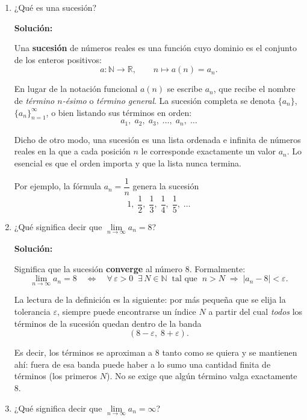 \documentclass[12pt]{article}
\newcommand{\solucion}{%
    \vspace{0.8em}%
    \textbf{Solución:}%
}
\begin{document}
\begin{enumerate}[label=\alph*.-]

    \item ¿Qué es una sucesión?

    \solucion

    Una \textbf{sucesión} de números reales es una función cuyo dominio es el
    conjunto de los enteros positivos:
    \[
    a:\mathbb{N}\longrightarrow\mathbb{R},
    \qquad
    n\longmapsto a(n)=a_n .
    \]

    En lugar de la notación funcional $a(n)$ se escribe $a_n$, que recibe el
    nombre de \emph{término $n$-ésimo} o \emph{término general}. La sucesión
    completa se denota $\{a_n\}$, $\{a_n\}_{n=1}^{\infty}$, o bien listando sus
    términos en orden:
    \[
    a_1,\;a_2,\;a_3,\;\dots,\;a_n,\;\dots
    \]

    Dicho de otro modo, una sucesión es una lista ordenada e infinita de números
    reales en la que a cada posición $n$ le corresponde exactamente un valor
    $a_n$. Lo esencial es que el orden importa y que la lista nunca termina.

    Por ejemplo, la fórmula $a_n=\dfrac{1}{n}$ genera la sucesión
    \[
    1,\;\frac12,\;\frac13,\;\frac14,\;\frac15,\;\dots
    \]

    \item ¿Qué significa decir que $\lim\limits_{n\to\infty}a_n=8$?

    \solucion

    Significa que la sucesión \textbf{converge} al número $8$. Formalmente:
    \[
    \lim_{n\to\infty}a_n=8
    \quad\Longleftrightarrow\quad
    \forall\,\varepsilon>0\;\;\exists\,N\in\mathbb{N}
    \;\;\text{tal que}\;\;
    n>N\;\Longrightarrow\;|a_n-8|<\varepsilon .
    \]

    La lectura de la definición es la siguiente: por más pequeña que se elija la
    tolerancia $\varepsilon$, siempre puede encontrarse un índice $N$ a partir
    del cual \emph{todos} los términos de la sucesión quedan dentro de la banda
    \[
    (8-\varepsilon,\;8+\varepsilon).
    \]

    Es decir, los términos se aproximan a $8$ tanto como se quiera y se mantienen
    ahí: fuera de esa banda puede haber a lo sumo una cantidad finita de términos
    (los primeros $N$). No se exige que algún término valga exactamente $8$.

    \item ¿Qué significa decir que $\lim\limits_{n\to\infty}a_n=\infty$?


\end{enumerate}
\end{document}
